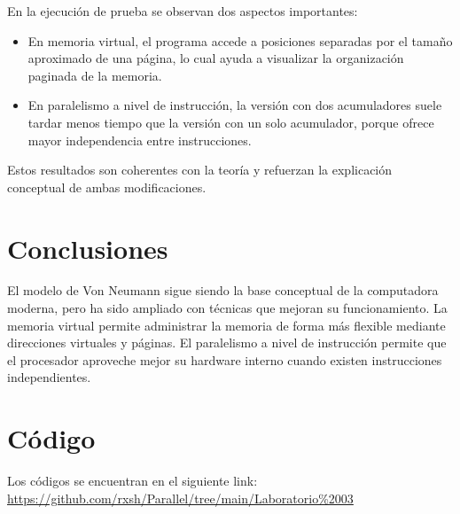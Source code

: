 \documentclass[11pt,a4paper]{article}
\begin{document}
En la ejecución de prueba se observan dos aspectos importantes:

\begin{itemize}
\item En memoria virtual, el programa accede a posiciones separadas por el tamaño aproximado de una página, lo cual ayuda a visualizar la organización paginada de la memoria.
\item En paralelismo a nivel de instrucción, la versión con dos acumuladores suele tardar menos tiempo que la versión con un solo acumulador, porque ofrece mayor independencia entre instrucciones.
\end{itemize}

Estos resultados son coherentes con la teoría y refuerzan la explicación conceptual de ambas modificaciones.

\section{Conclusiones}

El modelo de Von Neumann sigue siendo la base conceptual de la computadora moderna, pero ha sido ampliado con técnicas que mejoran su funcionamiento. La memoria virtual permite administrar la memoria de forma más flexible mediante direcciones virtuales y páginas. El paralelismo a nivel de instrucción permite que el procesador aproveche mejor su hardware interno cuando existen instrucciones independientes.

\section{Código}

Los códigos se encuentran en el siguiente link: \url{https://github.com/rxsh/Parallel/tree/main/Laboratorio%2003}
\end{document}
